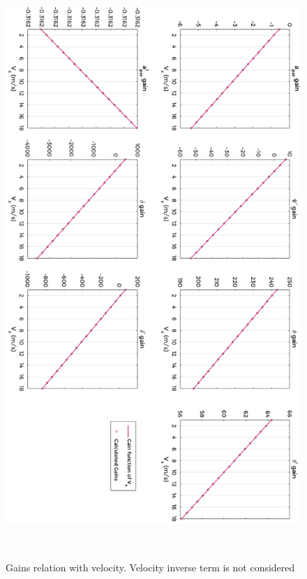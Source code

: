 \newpage
\begin{figure}[!h]
	\includegraphics[width=0.8\linewidth]{figs/06/control/model_gains}
	\caption{Gains relation with velocity. Velocity inverse term is not considered}
	\label{model_gains}
	\\[-0.5cm]
\end{figure}

